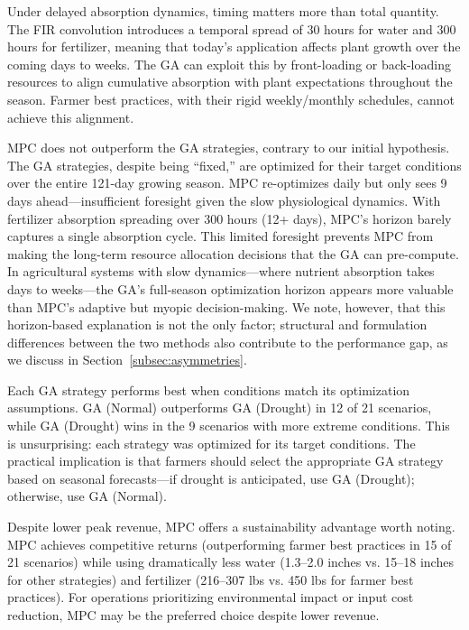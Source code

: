 \documentclass[pdflatex,sn-mathphys-num]{sn-jnl}
\begin{document}
Under delayed absorption dynamics, timing matters more than total quantity. The FIR convolution introduces a temporal spread of 30 hours for water and 300 hours for fertilizer, meaning that today's application affects plant growth over the coming days to weeks. The GA can exploit this by front-loading or back-loading resources to align cumulative absorption with plant expectations throughout the season. Farmer best practices, with their rigid weekly/monthly schedules, cannot achieve this alignment.

MPC does not outperform the GA strategies, contrary to our initial hypothesis. The GA strategies, despite being ``fixed,'' are optimized for their target conditions over the entire 121-day growing season. MPC re-optimizes daily but only sees 9 days ahead---insufficient foresight given the slow physiological dynamics. With fertilizer absorption spreading over 300 hours (12+ days), MPC's horizon barely captures a single absorption cycle. This limited foresight prevents MPC from making the long-term resource allocation decisions that the GA can pre-compute. In agricultural systems with slow dynamics---where nutrient absorption takes days to weeks---the GA's full-season optimization horizon appears more valuable than MPC's adaptive but myopic decision-making. We note, however, that this horizon-based explanation is not the only factor; structural and formulation differences between the two methods also contribute to the performance gap, as we discuss in Section~\ref{subsec:asymmetries}.

Each GA strategy performs best when conditions match its optimization assumptions. GA (Normal) outperforms GA (Drought) in 12 of 21 scenarios, while GA (Drought) wins in the 9 scenarios with more extreme conditions. This is unsurprising: each strategy was optimized for its target conditions. The practical implication is that farmers should select the appropriate GA strategy based on seasonal forecasts---if drought is anticipated, use GA (Drought); otherwise, use GA (Normal).

Despite lower peak revenue, MPC offers a sustainability advantage worth noting. MPC achieves competitive returns (outperforming farmer best practices in 15 of 21 scenarios) while using dramatically less water (1.3--2.0 inches vs. 15--18 inches for other strategies) and fertilizer (216--307 lbs vs. 450 lbs for farmer best practices). For operations prioritizing environmental impact or input cost reduction, MPC may be the preferred choice despite lower revenue.
\end{document}
